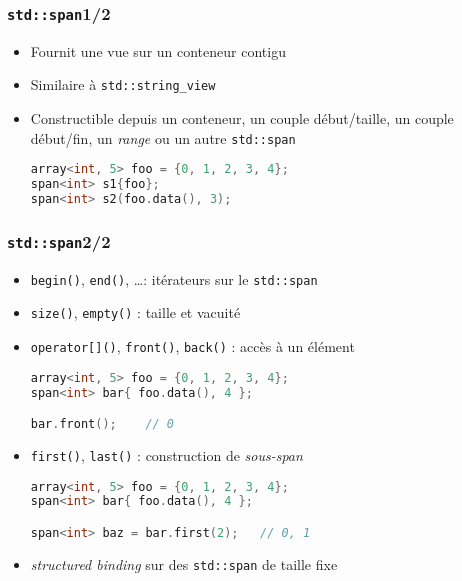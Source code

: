 \documentclass[C++.tex]{subfiles}
\begin{document}
\begin{frame}[fragile]
	\frametitle{\lstinline|std::span|\titlehfill{}1/2}
	\begin{itemize}
		\item Fournit une vue sur un conteneur contigu


		\item Similaire à \lstinline|std::string_view|
		\item Constructible depuis un conteneur, un couple début/taille, un couple début/fin, un \textit{range} ou un autre \lstinline|std::span|

	\begin{lstlisting}[language=C++]
array<int, 5> foo = {0, 1, 2, 3, 4};
span<int> s1{foo};
span<int> s2(foo.data(), 3);\end{lstlisting}
	\end{itemize}
\end{frame}

\begin{frame}[fragile]
	\frametitle{\lstinline|std::span|\titlehfill{}2/2}
	\begin{itemize}
		\item \lstinline|begin()|, \lstinline|end()|, \ldots : itérateurs sur le \lstinline|std::span|
		\item \lstinline|size()|, \lstinline|empty()| : taille et vacuité
		\item \lstinline|operator[]()|, \lstinline|front()|, \lstinline|back()| : accès à un élément

		\begin{lstlisting}[language=C++]
array<int, 5> foo = {0, 1, 2, 3, 4};
span<int> bar{ foo.data(), 4 };

bar.front();    // 0\end{lstlisting}

		\item \lstinline|first()|, \lstinline|last()| : construction de \textit{sous-span}

		\begin{lstlisting}[language=C++]
array<int, 5> foo = {0, 1, 2, 3, 4};
span<int> bar{ foo.data(), 4 };

span<int> baz = bar.first(2);   // 0, 1\end{lstlisting}

		\item \textit{structured binding} sur des \lstinline|std::span| de taille fixe
	\end{itemize}
\end{frame}
\end{document}
